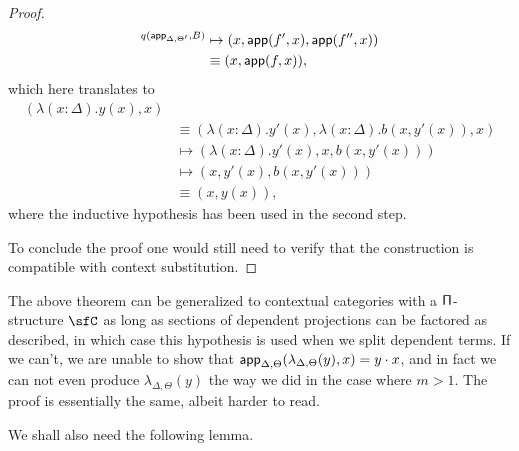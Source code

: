 \begin{proof}
\begin{align*}
    ^{q(\operatorname{\mathsf{app}}_{\Delta,\Theta'},B)}&\mapsto(x,\operatorname{\mathsf{app}}(f',x),\operatorname{\mathsf{app}}(f'',x)) \\
    &\equiv(x,\operatorname{\mathsf{app}}(f,x)),
  \end{align*}
  which here translates to
  \begin{align*}
    (\lambda(x:\Delta).y(x),x) \\
    &\equiv(\lambda(x:\Delta).y'(x),\lambda(x:\Delta).b(x,y'(x)),x) \\
    &\mapsto(\lambda(x:\Delta).y'(x),x,b(x,y'(x))) \\
    &\mapsto(x,y'(x),b(x,y'(x))) \\
    &\equiv(x,y(x)),
  \end{align*}
  where the inductive hypothesis has been used in the second step.

  \noindent
  To conclude the proof one would still need to verify that the construction is
  compatible with context substitution.
\end{proof}

\begin{rmk}
  The above theorem can be generalized to contextual categories with a
  $\operatorname{\mathsf{\Pi}}$-structure $\sfC$ as long as sections of dependent projections can be
  factored as described, in which case this hypothesis is used when we split
  dependent terms. If we can't, we are unable to show that
  $\operatorname{\mathsf{app}}_{\Delta,\Theta}(\lambda_{\Delta,\Theta}(y),x)=y\cdot x$, and in fact we
  can not even produce $\lambda_{\Delta,\Theta}(y)$ the way we did in the case
  where $m>1$. The proof is essentially the same, albeit harder to read.
\end{rmk}

  \noindent
We shall also need the following lemma.

